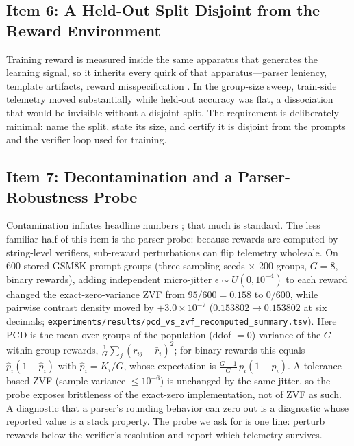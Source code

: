 \subsection{Item 6: A Held-Out Split Disjoint from the Reward Environment}
\label{sec:p5-item6}
Training reward is measured inside the same apparatus that generates the
learning signal, so it inherits every quirk of that apparatus---parser
leniency, template artifacts, reward misspecification
\citep{gao2023reward, krakovna2020specification}. In the \ours{} group-size
sweep, train-side telemetry moved substantially while held-out accuracy was
flat, a dissociation that would be invisible without a disjoint split. The
requirement is deliberately minimal: name the split, state its size, and
certify it is disjoint from the prompts and the verifier loop used for
training.

\subsection{Item 7: Decontamination and a Parser-Robustness Probe}
\label{sec:p5-item7}
Contamination inflates headline numbers \citep{zhang2024gsm1k,
riddell2024contamination}; that much is standard. The less familiar half of
this item is the parser probe: because rewards are computed by string-level
verifiers, sub-reward perturbations can flip telemetry wholesale. On 600
stored GSM8K prompt groups (three sampling seeds $\times$ 200 groups, $G{=}8$,
binary rewards), adding independent micro-jitter $\epsilon \sim U(0, 10^{-4})$
to each reward changed the exact-zero-variance ZVF from $95/600 = 0.158$ to
$0/600$, while pairwise contrast density moved by $+3.0\times 10^{-7}$
($0.153802 \to 0.153802$ at six decimals;
\texttt{experiments/results/pcd\_vs\_zvf\_recomputed\_summary.tsv}). Here
$\mathrm{PCD}$ is the mean over groups of the population (ddof $=0$) variance
of the $G$ within-group rewards, $\frac{1}{G}\sum_j (r_{ij}-\bar r_i)^2$; for
binary rewards this equals $\hat p_i(1-\hat p_i)$ with $\hat p_i = K_i/G$, whose
expectation is $\frac{G-1}{G}\,p_i(1-p_i)$. A tolerance-based ZVF (sample
variance $\le 10^{-6}$) is unchanged by the same jitter, so the probe exposes
brittleness of the exact-zero implementation, not of ZVF as such. A
diagnostic that a parser's rounding behavior can zero out is a diagnostic
whose reported value is a stack property. The probe we ask for is one line:
perturb rewards below the verifier's resolution and report which telemetry
survives.

